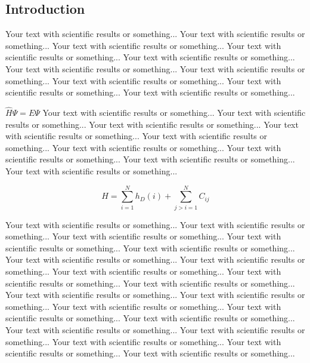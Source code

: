 \documentclass[final]{beamer}
\title
[Final Presentation for ML Course, June, 2017, Beijing]
{ %
Looooooooooooooooooooooooooong poster title \ldots{} to be continued
}
\author{ %
Author One\inst{1}, Author Two\inst{2}, Author Three\inst{2,3}
}
\institute
[Very Large University] %
{
\inst{1} Very Large University, Neverland\\[0.3ex]
\inst{2} Other University, Neverland\\[0.3ex]
\inst{3} Yet Another University, Neverland
}
\date{\today}
\begin{document}
\begin{frame}[t]
\begin{multicols}{3}

\section{Introduction}

Your text with scientific results or something...
Your text with scientific results or something...
Your text with scientific results or something...
Your text with scientific results or something...
Your text with scientific results or something...
Your text with scientific results or something...
Your text with scientific results or something...
Your text with scientific results or something...
Your text with scientific results or something...
Your text with scientific results or something...

 $\hat H \Psi = E \Psi$
Your text with scientific results or something...
Your text with scientific results or something...
Your text with scientific results or something...
Your text with scientific results or something...
Your text with scientific results or something...
Your text with scientific results or something...
Your text with scientific results or something...
Your text with scientific results or something...
Your text with scientific results or something...

\begin{equation}
H = \sum_{i=1}^{N} h_{D}(i) + \sum_{j>i=1}^{N} C_{ij}
\end{equation}

Your text with scientific results or something...
Your text with scientific results or something...
Your text with scientific results or something...
Your text with scientific results or something...
Your text with scientific results or something...
Your text with scientific results or something...
Your text with scientific results or something...
Your text with scientific results or something...
Your text with scientific results or something...
Your text with scientific results or something...
Your text with scientific results or something...
Your text with scientific results or something...
Your text with scientific results or something...
Your text with scientific results or something...
Your text with scientific results or something...
Your text with scientific results or something...
Your text with scientific results or something...
Your text with scientific results or something...
Your text with scientific results or something...
Your text with scientific results or something...


\end{multicols}
\end{frame}
\end{document}
